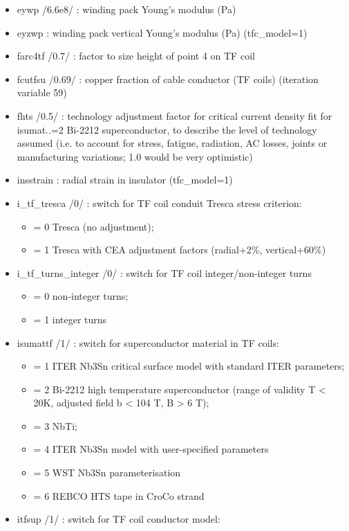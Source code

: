\documentclass[
]{article}
\providecommand{\tightlist}{%
  \setlength{\itemsep}{0pt}\setlength{\parskip}{0pt}}
\begin{document}
\begin{itemize}
\begin{itemize}
  \item
    eywp /6.6e8/ : winding pack Young's modulus (Pa)
  \item
    eyzwp : winding pack vertical Young's modulus (Pa) (tfc\_model=1)
  \item
    farc4tf /0.7/ : factor to size height of point 4 on TF coil
  \item
    fcutfsu /0.69/ : copper fraction of cable conductor (TF coils)
    (iteration variable 59)
  \item
    fhts /0.5/ : technology adjustment factor for critical current
    density fit for isumat..=2 Bi-2212 superconductor, to describe the
    level of technology assumed (i.e. to account for stress, fatigue,
    radiation, AC losses, joints or manufacturing variations; 1.0 would
    be very optimistic)
  \item
    insstrain : radial strain in insulator (tfc\_model=1)
  \item
    i\_tf\_tresca /0/ : switch for TF coil conduit Tresca stress
    criterion:

    \begin{itemize}
    \tightlist
    \item
      = 0 Tresca (no adjustment);
    \item
      = 1 Tresca with CEA adjustment factors (radial+2\%, vertical+60\%)
    \end{itemize}
  \item
    i\_tf\_turns\_integer /0/ : switch for TF coil integer/non-integer
    turns

    \begin{itemize}
    \tightlist
    \item
      = 0 non-integer turns;
    \item
      = 1 integer turns
    \end{itemize}
  \item
    isumattf /1/ : switch for superconductor material in TF coils:

    \begin{itemize}
    \tightlist
    \item
      = 1 ITER Nb3Sn critical surface model with standard ITER
      parameters;
    \item
      = 2 Bi-2212 high temperature superconductor (range of validity T
      \textless{} 20K, adjusted field b \textless{} 104 T, B
      \textgreater{} 6 T);
    \item
      = 3 NbTi;
    \item
      = 4 ITER Nb3Sn model with user-specified parameters
    \item
      = 5 WST Nb3Sn parameterisation
    \item
      = 6 REBCO HTS tape in CroCo strand
    \end{itemize}
  \item
    itfsup /1/ : switch for TF coil conductor model:


\end{itemize}
\end{itemize}
\end{document}
